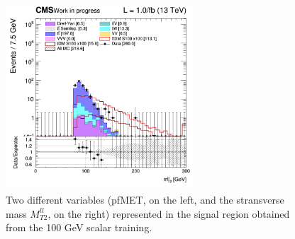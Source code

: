 \documentclass[a4paper, 10pt, openright]{report}
\begin{document}
\begin{figure}[htbp]
{\begin{minipage}[b]{.48\textwidth}
\end{minipage}\hfill
\begin{minipage}[b]{.48\textwidth}
\includegraphics[width=7cm, height=7cm]{figs/2017/SRBlinded-ttDM-scalar100/log_cratio_topCR_ll_BDT_ttDM100_mt2ll.png}
\end{minipage} \hfill
}
\caption{Two different variables (pf\ac{MET}, on the left, and the stransverse mass $M_{T2}^{ll}$, on the right) represented in the signal region obtained from the 100 GeV scalar training.}
\label{fig:SR1}
\end{figure}
\end{document}
